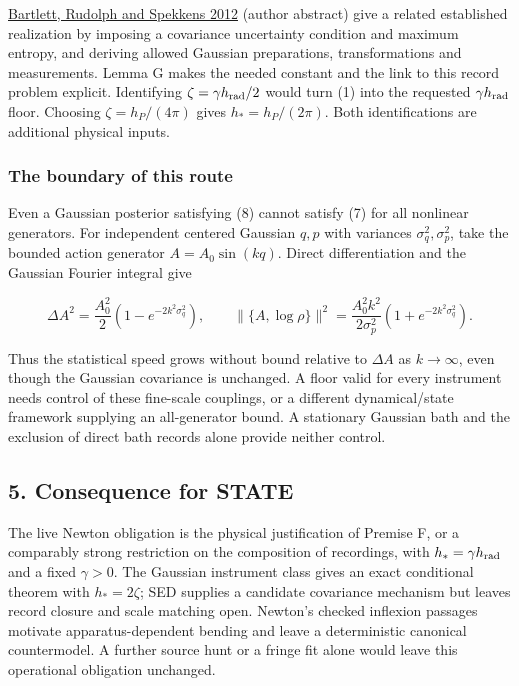 \documentclass[11pt,a4paper]{article}
\begin{document}
\href{https://arxiv.org/abs/1111.5057}{Bartlett, Rudolph and Spekkens
2012} (author abstract) give a related established realization by
imposing a covariance uncertainty condition and maximum entropy, and
deriving allowed Gaussian preparations, transformations and
measurements. Lemma G makes the needed constant and the link to this
record problem explicit. Identifying \(\zeta=\gamma h_{\rm rad}/2\)
would turn (1) into the requested \(\gamma h_{\rm rad}\) floor. Choosing
\(\zeta=h_P/(4\pi)\) gives \(h_*=h_P/(2\pi)\). Both identifications are
additional physical inputs.

\hypertarget{the-boundary-of-this-route}{%
\subsubsection{The boundary of this
route}\label{the-boundary-of-this-route}}

Even a Gaussian posterior satisfying (8) cannot satisfy (7) for all
nonlinear generators. For independent centered Gaussian \(q,p\) with
variances \(\sigma_q^2,\sigma_p^2\), take the bounded action generator
\(A=A_0\sin(kq)\). Direct differentiation and the Gaussian Fourier
integral give

\[\Delta A^2=\frac{A_0^2}{2}(1-e^{-2k^2\sigma_q^2}),\qquad
\|\{A,\log\rho\}\|^2=
\frac{A_0^2k^2}{2\sigma_p^2}(1+e^{-2k^2\sigma_q^2}). \tag{9}\]

Thus the statistical speed grows without bound relative to \(\Delta A\)
as \(k\to\infty\), even though the Gaussian covariance is unchanged. A
floor valid for every instrument needs control of these fine-scale
couplings, or a different dynamical/state framework supplying an
all-generator bound. A stationary Gaussian bath and the exclusion of
direct bath records alone provide neither control.

\hypertarget{consequence-for-state}{%
\subsection{5. Consequence for STATE}\label{consequence-for-state}}

The live Newton obligation is the physical justification of Premise F,
or a comparably strong restriction on the composition of recordings,
with \(h_*=\gamma h_{\rm rad}\) and a fixed \(\gamma>0\). The Gaussian
instrument class gives an exact conditional theorem with \(h_*=2\zeta\);
SED supplies a candidate covariance mechanism but leaves record closure
and scale matching open. Newton's checked inflexion passages motivate
apparatus-dependent bending and leave a deterministic canonical
countermodel. A further source hunt or a fringe fit alone would leave
this operational obligation unchanged.
\end{document}
